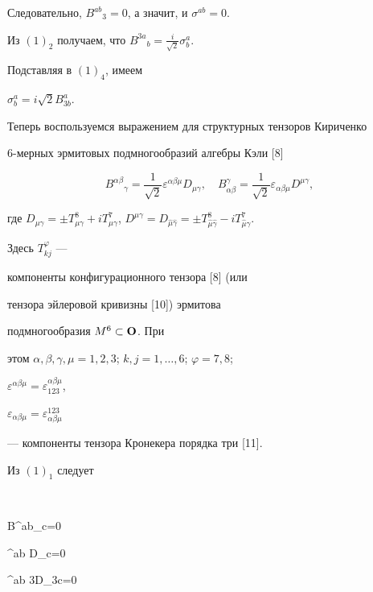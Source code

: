Следовательно, $B^{ab}{_3} = 0$, а значит, и $\sigma^{ab}=0$. 


Из $(1)_2$ получаем, что $B^{3a}{_b}=\frac {i}{\sqrt {2}}\sigma^a_b$. 


Подставляя в $(1)_4$, имеем


$\sigma^a_b = i \sqrt {2} B_{3b}^a$.





Теперь воспользуемся выражением для структурных тензоров Кириченко 


6-мерных эрмитовых подмногообразий алгебры Кэли [8]


$$


B^{\alpha\beta} {_\gamma} =


\frac {1}{\sqrt {2}} \varepsilon ^{\alpha\beta \mu}


D_{\mu \gamma}, \quad B_{\alpha\beta}^\gamma


=\frac {1}{\sqrt 2} \varepsilon _{\alpha\beta\mu} 


D^{\mu \gamma},


$$


где $D_{\mu\gamma}=\pm T^8_{\mu \gamma} + 


i T^7_{\mu\gamma}$, $D^{\mu \gamma}=


D_{\hat {\mu} \hat {\gamma}}=


\pm T^8_{\hat{\mu} \hat {\gamma}} 


- i T^7_{\hat {\mu}\hat{\gamma}}$. 


Здесь $T^{\varphi}_{kj}$ --- 


компоненты конфигурационного тензора [8] (или 


тензора эйлеровой кривизны [10]) эрмитова 


подмногообразия $M^6 \subset \bold O$. При 


этом $\alpha,\beta,\gamma,\mu=1,2,3$;  $k,j=1,\dotsc,6$; $\varphi=7,8$; 


$\varepsilon^{\alpha\beta\mu}=\varepsilon^{\alpha\beta\mu}_{123}$,


$\varepsilon _{\alpha\beta\mu}=\varepsilon^{123}_{\alpha\beta\mu}$ 


--- компоненты тензора Кронекера порядка три [11].


Из $(1)_1$ следует


$$


B^{ab}{_c}=0 \; \Leftrightarrow


\;  \varepsilon^{ab\gamma} D_{\gamma c}=0 \; \Leftrightarrow 


\; \varepsilon^{ab 3}D_{3c}=0 \; 


